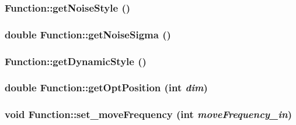 \hypertarget{classFunction_5d1c101ec674fb9c792fe119897693ff}{
\subsubsection{ Function::getNoiseStyle ()}}
\label{classFunction_5d1c101ec674fb9c792fe119897693ff}


\hypertarget{classFunction_b91fde86475670d74b292373558f8c94}{
\subsubsection{\setlength{\rightskip}{0pt plus 5cm}double Function::getNoiseSigma ()}}
\label{classFunction_b91fde86475670d74b292373558f8c94}


\hypertarget{classFunction_6b8d4f0e5f160a7ead82d28c96046955}{
\subsubsection{ Function::getDynamicStyle ()}}
\label{classFunction_6b8d4f0e5f160a7ead82d28c96046955}


\hypertarget{classFunction_d9ee70cdb276c5b7c561cd262eb8fa89}{
\subsubsection{\setlength{\rightskip}{0pt plus 5cm}double Function::getOptPosition (int {\em dim})}}
\label{classFunction_d9ee70cdb276c5b7c561cd262eb8fa89}


\hypertarget{classFunction_f2ec150f2e16d03e7ecb11f28edae9d7}{
\subsubsection{\setlength{\rightskip}{0pt plus 5cm}void Function::set\_\-moveFrequency (int {\em moveFrequency\_\-in})}}
\label{classFunction_f2ec150f2e16d03e7ecb11f28edae9d7}


